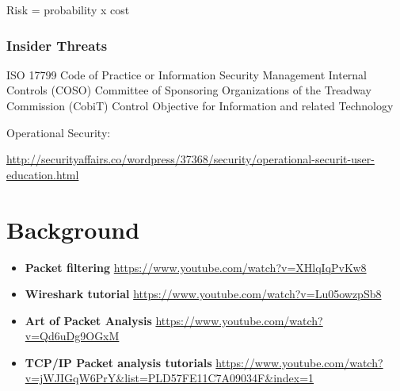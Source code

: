\documentclass[dvipdfm]{book}
\begin{document}
Risk = probability x cost

\subsection{Insider Threats}

ISO 17799 Code of Practice or Information Security Management
Internal Controls
  (COSO) Committee of Sponsoring Organizations of the Treadway Commission
  (CobiT) Control Objective for Information and related Technology

Operational Security:

\url{http://securityaffairs.co/wordpress/37368/security/operational-securit-user-education.html}

\chapter{Background}
\begin{itemize}
\item {\bf Packet filtering}
\url{https://www.youtube.com/watch?v=XHlqIqPvKw8}
\item {\bf Wireshark tutorial}
\url{https://www.youtube.com/watch?v=Lu05owzpSb8}
\item {\bf Art of Packet Analysis}
\url{https://www.youtube.com/watch?v=Qd6uDg9OGxM}
\item {\bf TCP/IP Packet analysis tutorials}
\url{https://www.youtube.com/watch?v=jWJIGqW6PrY&list=PLD57FE11C7A09034F&index=1}
\end{itemize}
\end{document}

